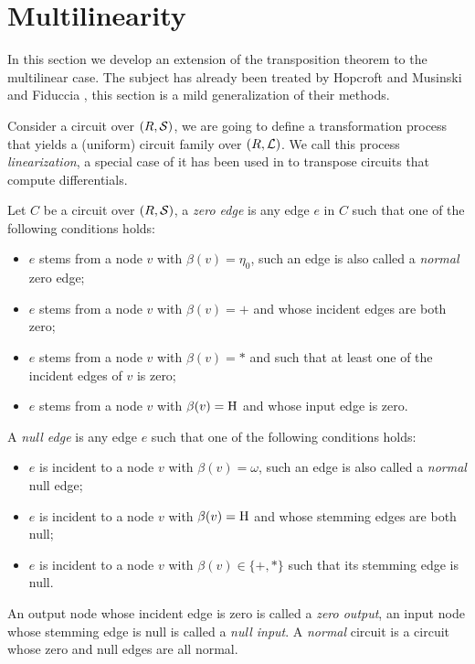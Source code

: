 \section{Multilinearity}
\label{sec:multi}

In this section we develop an extension of the transposition theorem
to the multilinear case.  The subject has already been treated by
Hopcroft and Musinski \cite{HoMu73} and Fiduccia \cite{Fid73}, this
section is a mild generalization of their methods.

Consider a circuit over $(R, \mathcal{S})$, we are going to define a
transformation process that yields a (uniform) circuit family over
$(R,\mathcal{L})$. We call this process \emph{linearization}, a special
case of it has been used in \cite{GG05,Ser08} to transpose circuits
that compute differentials.

\begin{definition}
  Let $C$ be a circuit over $(R,\mathcal{S})$, a \emph{zero edge} is any
  edge $e$ in $C$ such that one of the following conditions holds:
  \begin{itemize}
  \item $e$ stems from a node $v$ with $\beta(v)=\eta_0$, such an edge
    is also called a \emph{normal} zero edge;
  \item $e$ stems from a node $v$ with $\beta(v)=+$ and whose incident
    edges are both zero;
  \item $e$ stems from a node $v$ with $\beta(v)=*$ and such that at
    least one of the incident edges of $v$ is zero;
  \item $e$ stems from a node $v$ with $\beta(v)=\operatorname{H}$ and whose input
    edge is zero.
  \end{itemize}
  A \emph{null edge} is any edge $e$ such that one of the following
  conditions holds:
  \begin{itemize}
  \item $e$ is incident to a node $v$ with $\beta(v)=\omega$, such an
    edge is also called a \emph{normal} null edge;
  \item $e$ is incident to a node $v$ with $\beta(v)=\operatorname{H}$ and whose
    stemming edges are both null;
  \item $e$ is incident to a node $v$ with $\beta(v)\in\{+,*\}$ such
    that its stemming edge is null.
  \end{itemize}
  An output node whose incident edge is zero is called a \emph{zero
    output}, an input node whose stemming edge is null is called a
  \emph{null input}.  A \emph{normal} circuit is a circuit whose zero
  and null edges are all normal.
\end{definition}

